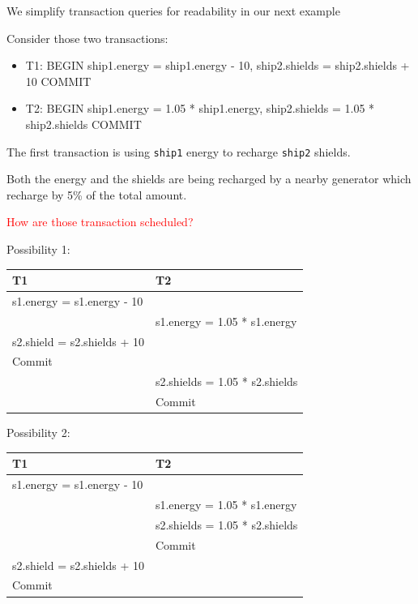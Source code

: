 \documentclass{beamer}
\newcommand{\red}[1]{
\textcolor{red}{#1}
}
\begin{document}
\begin{slide}{
\item We simplify transaction queries for readability in our next example  
\pause
\item Consider those two transactions:
\begin{itemize}
	\item T1:	BEGIN   ship1.energy = ship1.energy - 10, ship2.shields = ship2.shields + 10    COMMIT
	\item T2:	BEGIN   ship1.energy = 1.05 * ship1.energy,  ship2.shields = 1.05 * ship2.shields   COMMIT
\end{itemize}
\pause
\item The first transaction is using \texttt{ship1} energy to recharge \texttt{ship2} shields.  
\item Both the energy and the shields are being recharged by a nearby generator which recharge by 5\% of the total amount.
\item \red{How are those transaction scheduled?}	
}\end{slide}


\begin{slide}{
\item Possibility 1:
\begin{table}
	\tiny
	\begin{tabular}{l|l}
		T1 & T2\\
		\hline
		s1.energy = s1.energy - 10 & \\
		& s1.energy = 1.05 * s1.energy \\
		s2.shield = s2.shields + 10 & \\
		Commit & \\
		& s2.shields = 1.05 * s2.shields \\
		& Commit
	\end{tabular}
\end{table}
}\end{slide}

\begin{slide}{
		\item Possibility 2:
		\begin{table}
			\tiny
			\begin{tabular}{l|l}
				T1 & T2\\
				\hline
				s1.energy = s1.energy - 10 & \\
				& s1.energy = 1.05 * s1.energy \\
				& s2.shields = 1.05 * s2.shields \\
				& Commit \\	
				s2.shield = s2.shields + 10 & \\
				Commit & \\
			\end{tabular}
		\end{table}
}\end{slide}
\end{document}
